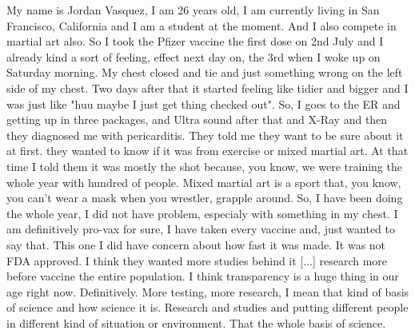 My name is Jordan Vasquez, I am 26 years old, I am currently living in San
Francisco, California and I am a student at the moment. And I also compete in
martial art also. So I took the Pfizer vaccine the first dose on 2nd July and I
already kind a sort of feeling, effect next day on, the 3rd when I woke up on
Saturday morning. My chest closed and tie and just something wrong on the left
side of my chest. Two days after that it started feeling like tidier and bigger
and I was just like "huu maybe I just get thing checked out". So, I goes to the
ER and getting up in three packages, and Ultra sound after that and X-Ray and
then they diagnosed me with pericarditis. They told me they want to be sure
about it at first. they wanted to know if it was from exercise or mixed martial
art. At that time I told them it was mostly the shot because, you know, we were
training the whole year with hundred of people. Mixed martial art is a sport
that, you know, you can't wear a mask when you wrestler, grapple around. So, I
have been doing the whole year, I did not have problem, especialy with something
in my chest. I am definitively pro-vax for sure, I have taken every vaccine and,
just wanted to say that. This one I did have concern about how fast it was
made. It was not FDA approved. I think they wanted more studies behind it [...]
research more before vaccine the entire population. I think transparency is a
huge thing in our age right now. Definitively. More testing, more research, I
mean that kind of basis of science and how science it is. Research and studies
and putting different people in different kind of situation or environment. That
the whole basis of science.

